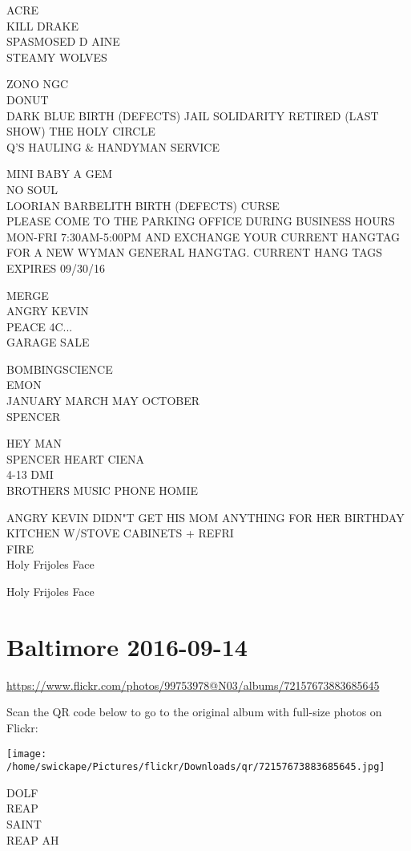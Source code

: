 \documentclass[10pt,letterpaper]{article}
\begin{document}
ACRE\\
KILL DRAKE\\
SPASMOSED D AINE\\
STEAMY WOLVES

ZONO NGC\\
DONUT\\
DARK BLUE BIRTH (DEFECTS) JAIL SOLIDARITY RETIRED (LAST SHOW) THE HOLY CIRCLE\\
Q'S HAULING \& HANDYMAN SERVICE

MINI BABY A GEM\\
NO SOUL\\
LOORIAN BARBELITH BIRTH (DEFECTS) CURSE\\
PLEASE COME TO THE PARKING OFFICE DURING BUSINESS HOURS MON{-}FRI 7:30AM{-}5:00PM AND EXCHANGE YOUR CURRENT HANGTAG FOR A NEW WYMAN GENERAL HANGTAG.  CURRENT HANG TAGS EXPIRES 09/30/16

MERGE\\
ANGRY KEVIN\\
PEACE 4C...\\
GARAGE SALE

BOMBINGSCIENCE\\
EMON\\
JANUARY MARCH MAY OCTOBER\\
SPENCER

HEY MAN\\
SPENCER HEART CIENA\\
4{-}13 DMI\\
BROTHERS MUSIC PHONE HOMIE

ANGRY KEVIN DIDN"T GET HIS MOM ANYTHING FOR HER BIRTHDAY\\
KITCHEN W/STOVE CABINETS + REFRI\\
FIRE\\
Holy Frijoles Face

Holy Frijoles Face


\section*{Baltimore 2016-09-14}

\url{https://www.flickr.com/photos/99753978@N03/albums/72157673883685645}

Scan the QR code below to go to the original album with full-size photos on Flickr:

\texttt{[image: /home/swickape/Pictures/flickr/Downloads/qr/72157673883685645.jpg]}


DOLF\\
REAP\\
SAINT\\
REAP AH
\end{document}
